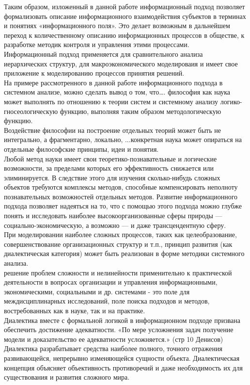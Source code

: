 \documentclass[a4paper,12pt]{report}
\begin{document}
Таким образом, изложенный в данной работе информационный подход позволяет формализовать описание информационного взаимодействия субъектов в терминах и понятиях «информационного поля». Это делает возможным в дальнейшем переход к количественному описанию информационных процессов в обществе, к разработке методик контроля и управления этими процессами. \\
Информационный подход применяется для сравнительного анализа иерархических структур, для макроэкономического моделироваия и  имеет свое приложение к моделированию процессов принятия решений.\\
На примере рассмотренного в данной работе информационного подхода в системном анализе, можно сделать вывод о том, что…. философия как наука может выполнять по отношению к теории систем и системному анализу логико-гносеологическую функцию, выполняя таким образом методологическую функцию.  \\
Воздействие философии на построение отдельных теорий может быть не интегрально, а фрагментарно, локально, ...конкретная наука может опираться на отдельные философские принципы, идеи и понятия. \\


Любой метод науки имеет свои теоретико-познавательные и логические возможности, за пределами которых его эффективность снижается или элиминируется. В следствие этого для изучения сколько-нибудь сложных объектов требуются комплексы методов, способные компенсировать неполноту познавательных возможностей отдельных методов. Развитие информационного подхода позволяет надеяться на то, что с помощью этого подхода можно глубже понять и исследовать наиболее высокоорганизованные сферы природы — социально-экономическую, а возможно — и даже трансцендентную сферу.\\

При моделировании наиболее сложных процессов, таких как целеобразование, совершенствование организационных структур и т.п., принцип развития (как диалектическая категория) может быть реализован в форме методики системного анализа. \\
решение проблем сложности и нелинейности применительно к практической деятельности в вопросах организации и управления информационными, экономическими, социальными и др. системами - это поле для междисциплинарных исследований, поле поиска подходов и методов, востребованных как в науке, так и на практике. \\

Диалектика вместе с формальной логикой в информационном подходе призвана обеспечить достижение  адекватности. «По мере усложнения задач получение модели и доказательство ее адекватности усложняется.» (стр 10 Денисов) Диалектика разрабатывает средства наиболее полного, точного отражения развивающейся, непрерывно изменяющейся сущности объекта. 
 Диалектическая концепция объясняет объективность противоречий и даже необходимость их для существования и развития сложного мира.\\
\end{document}
